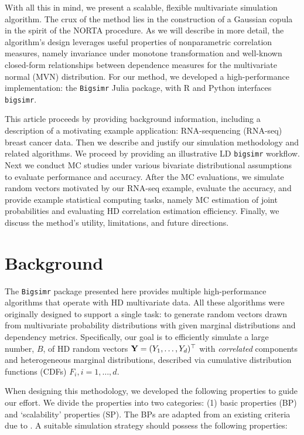 \documentclass[
]{jss}
\begin{document}
With all this in mind, we present a scalable, flexible multivariate simulation algorithm. The crux of the method lies in the construction of a Gaussian copula in the spirit of the NORTA procedure. As we will describe in more detail, the algorithm's design leverages useful properties of nonparametric correlation measures, namely invariance under monotone transformation and well-known closed-form relationships between dependence measures for the multivariate normal (MVN) distribution. For our method, we developed a high-performance implementation: the \texttt{Bigsimr} Julia package, with R and Python interfaces \texttt{bigsimr}.

This article proceeds by providing background information, including a description of a motivating example application: RNA-sequencing (RNA-seq) breast cancer data. Then we describe and justify our simulation methodology and related algorithms. We proceed by providing an illustrative LD \texttt{bigsimr} workflow. Next we conduct MC studies under various bivariate distributional assumptions to evaluate performance and accuracy. After the MC evaluations, we simulate random vectors motivated by our RNA-seq example, evaluate the accuracy, and provide example statistical computing tasks, namely MC estimation of joint probabilities and evaluating HD correlation estimation efficiency. Finally, we discuss the method's utility, limitations, and future directions.

\hypertarget{background}{%
\section{Background}\label{background}}

The \texttt{Bigsimr} package presented here provides multiple high-performance algorithms that operate with HD multivariate data. All these algorithms were originally designed to support a single task: to generate random vectors drawn from multivariate probability distributions with given marginal distributions and dependency metrics. Specifically, our goal is to efficiently simulate a large number, \(B\), of HD random vectors \({\bf Y}=(Y_1, \ldots, Y_d)^\top\) with \emph{correlated} components and heterogeneous marginal distributions, described via cumulative distribution functions (CDFs) \(F_i, i=1,\ldots,d\).

When designing this methodology, we developed the following properties to guide our effort. We divide the properties into two categories: (1) basic properties (BP) and `scalability' properties (SP). The BPs are adapted from an existing criteria due to \citet{Nik13a}. A suitable simulation strategy should possess the following properties:
\end{document}
